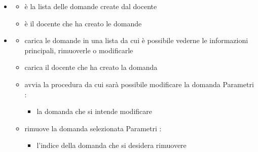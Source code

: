 \begin{itemize}
\item {}
\begin{itemize}
\item {}
\newline
è la lista delle domande create dal docente
\item {}
\newline
è il docente che ha creato le domande
\end{itemize}
\item {}
\begin{itemize}
\item {}
\newline
carica le domande in una lista da cui è possibile vederne le informazioni principali, rimuoverle o modificarle
\newline
\item {}
\newline
carica il docente che ha creato la domanda
\newline
\item {}
\newline
avvia la procedura da cui sarà possibile modificare la domanda
\newline
Parametri :
\begin{itemize}
\item {}
\newline
la domanda che si intende modificare
\end{itemize}
\item {}
\newline
rimuove la domanda selezionata
\newline
Parametri :
\begin{itemize}
\item {}
\newline
l'indice della domanda che si desidera rimuovere
\end{itemize}
\end{itemize}
\end{itemize}
